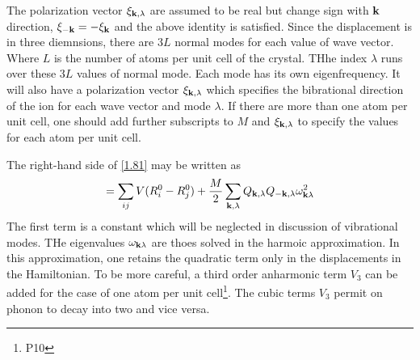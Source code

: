 The polarization vector $\xi_{\mathbf{k},\lambda}$ are assumed to be real but change sign with $\mathbf{k}$ direction, $\xi_{-\mathbf{k}} = -\xi_{\mathbf{k}}$ and the above identity is satisfied.
Since the displacement is in three diemnsions, there are $3L$ normal modes for each value of wave vector.
Where $L$ is the number of atoms per unit cell of the crystal.
THhe index $\lambda$ runs over these $3L$ values of normal mode.
Each mode has its own eigenfrequency.
It will also have a polarization vector $\xi_{\mathbf{k},\lambda}$ which specifies the bibrational direction of the ion for each wave vector and mode $\lambda$.
If there are more than one atom per unit cell, one should add further subscripts to $M$ and $\xi_{\mathbf{k},\lambda} $ to specify the values for each atom per unit cell.

The right-hand side of \eqref{1.81} may be written as
\begin{equation}
    = \sum_{ij} V(R^0_i - R^0_j) + \frac{M}{2} \sum_{\mathbf{k},\lambda} Q_{\mathbf{k},\lambda} Q_{-\mathbf{k},\lambda} \omega_{\mathbf{k}\lambda}^2    \label{1.87}
\end{equation}
The first term is a constant which will be neglected in discussion of vibrational modes.
THe eigenvalues $\omega_{\mathbf{k}\lambda}$ are thoes solved in the harmoic approximation.
In this approximation, one retains the quadratic term only in the displacements in the Hamiltonian.
To be more careful, a third order anharmonic term $V_3$ can be added for the case of one atom per unit cell\footnote{P10}.
The cubic terms $V_3$ permit on phonon to decay into two and vice versa.

